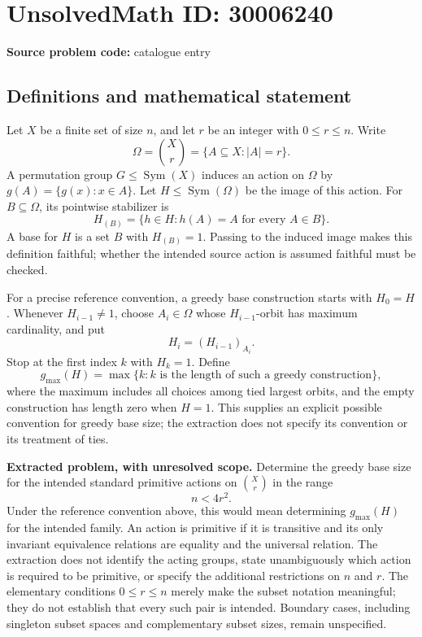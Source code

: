 \documentclass[11pt]{article}
\begin{document}
\section*{UnsolvedMath ID: 30006240}
\textbf{Source problem code:} catalogue entry
\subsection{Definitions and mathematical statement}
Let \(X\) be a finite set of size \(n\), and let \(r\) be an integer with \(0\le r\le n\). Write
\[
\Omega=\binom{X}{r}=\{A\subseteq X:|A|=r\}.
\]
A permutation group \(G\le\operatorname{Sym}(X)\) induces an action on \(\Omega\) by \(g(A)=\{g(x):x\in A\}\). Let \(H\le\operatorname{Sym}(\Omega)\) be the image of this action. For \(B\subseteq\Omega\), its pointwise stabilizer is
\[
H_{(B)}=\{h\in H:h(A)=A\text{ for every }A\in B\}.
\]
A base for \(H\) is a set \(B\) with \(H_{(B)}=1\). Passing to the induced image makes this definition faithful; whether the intended source action is assumed faithful must be checked.

For a precise reference convention, a greedy base construction starts with \(H_0=H\). Whenever \(H_{i-1}\ne1\), choose \(A_i\in\Omega\) whose \(H_{i-1}\)-orbit has maximum cardinality, and put
\[
H_i=(H_{i-1})_{A_i}.
\]
Stop at the first index \(k\) with \(H_k=1\). Define
\[
g_{\max}(H)=\max\{k:k\text{ is the length of such a greedy construction}\},
\]
where the maximum includes all choices among tied largest orbits, and the empty construction has length zero when \(H=1\). This supplies an explicit possible convention for greedy base size; the extraction does not specify its convention or its treatment of ties.

\textbf{Extracted problem, with unresolved scope.} Determine the greedy base size for the intended standard primitive actions on \(\binom{X}{r}\) in the range
\[
n<4r^2.
\]
Under the reference convention above, this would mean determining \(g_{\max}(H)\) for the intended family. An action is primitive if it is transitive and its only invariant equivalence relations are equality and the universal relation. The extraction does not identify the acting groups, state unambiguously which action is required to be primitive, or specify the additional restrictions on \(n\) and \(r\). The elementary conditions \(0\le r\le n\) merely make the subset notation meaningful; they do not establish that every such pair is intended. Boundary cases, including singleton subset spaces and complementary subset sizes, remain unspecified.
\end{document}
